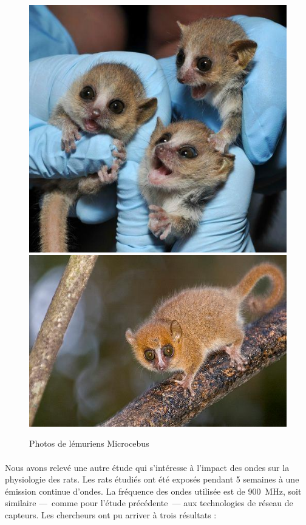     \begin{figure}[h]
        \centering
        \includegraphics[scale=0.35]{images/photos/lemuzobs.jpg}
        \includegraphics[trim={4.3cm 0cm 0cm 0cm},clip,scale=0.505]{images/photos/lemu.jpg}
        \caption{Photos de lémuriens Microcebus}
        \label{fig:lemuzob}
    \end{figure}
    
    \paragraph{} Nous avons relevé une autre étude  \cite{test1} qui s'intéresse à l'impact des ondes sur la physiologie des rats. Les rats étudiés ont été exposés pendant 5 semaines à une émission continue d'ondes. La fréquence des ondes utilisée est de 900~MHz, soit similaire ---~comme pour l'étude précédente~--- aux technologies de réseau de capteurs. Les chercheurs ont pu arriver à trois résultats :
    
